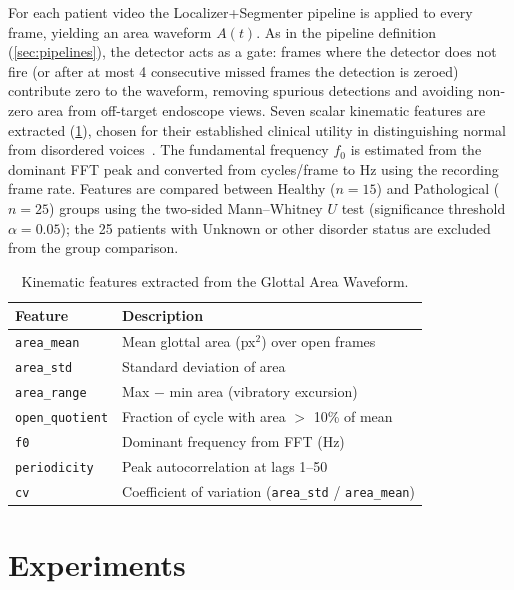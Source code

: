 \documentclass[preprint,12pt]{elsarticle}
\newcommand{\yolounet}{Localizer+Segmenter}
\begin{document}
For each patient video the \yolounet{} pipeline is applied to every frame,
yielding an area waveform $A(t)$.
As in the pipeline definition (\cref{sec:pipelines}), the detector acts as a
gate: frames where the detector does not fire (or after at most
\num{4} consecutive missed frames the detection is zeroed) contribute zero
to the waveform, removing spurious detections and avoiding non-zero
area from off-target endoscope views.
Seven scalar kinematic features are extracted (\cref{tab:features}), chosen
for their established clinical utility in distinguishing normal from
disordered voices~\cite{patel2015kinematic}.
The fundamental frequency $f_0$ is estimated from the dominant FFT peak and
converted from cycles/frame to Hz using the recording frame rate.
Features are compared between Healthy (\(n{=}15\)) and Pathological
(\(n{=}25\)) groups using the two-sided Mann--Whitney $U$ test (significance
threshold $\alpha{=}0.05$); the \num{25} patients with Unknown or other disorder status
are excluded from the group comparison.

\begin{table}[t]
\centering
\caption{Kinematic features extracted from the Glottal Area Waveform.}
\label{tab:features}
\begin{tabular}{ll}
\toprule
Feature & Description \\
\midrule
\texttt{area\_mean}    & Mean glottal area (px$^2$) over open frames \\
\texttt{area\_std}     & Standard deviation of area \\
\texttt{area\_range}   & Max $-$ min area (vibratory excursion) \\
\texttt{open\_quotient}& Fraction of cycle with area $>$ 10\% of mean \\
\texttt{f0}            & Dominant frequency from FFT (Hz) \\
\texttt{periodicity}   & Peak autocorrelation at lags 1--50 \\
\texttt{cv}            & Coefficient of variation (\texttt{area\_std} / \texttt{area\_mean}) \\
\bottomrule
\end{tabular}
\end{table}

\section{Experiments}
\label{sec:experiments}
\end{document}
